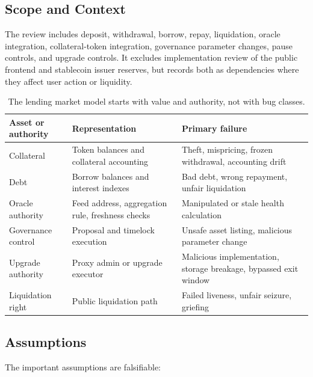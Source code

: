 \subsection{Scope and Context}

The review includes deposit, withdrawal, borrow, repay, liquidation, oracle integration, collateral-token integration, governance parameter changes, pause controls, and upgrade controls. It excludes implementation review of the public frontend and stablecoin issuer reserves, but records both as dependencies where they affect user action or liquidity.

\begin{table}[htbp]
\centering
\small
\renewcommand{\arraystretch}{1.18}
\begin{tabularx}{\textwidth}{@{}>{\RaggedRight\arraybackslash}p{}>{\RaggedRight\arraybackslash}p{}X@{}}
\toprule
Asset or authority & Representation & Primary failure \\
\midrule
Collateral & Token balances and collateral accounting & Theft, mispricing, frozen withdrawal, accounting drift \\
Debt & Borrow balances and interest indexes & Bad debt, wrong repayment, unfair liquidation \\
Oracle authority & Feed address, aggregation rule, freshness checks & Manipulated or stale health calculation \\
Governance control & Proposal and timelock execution & Unsafe asset listing, malicious parameter change \\
Upgrade authority & Proxy admin or upgrade executor & Malicious implementation, storage breakage, bypassed exit window \\
Liquidation right & Public liquidation path & Failed liveness, unfair seizure, griefing \\
\bottomrule
\end{tabularx}
\caption{The lending market model starts with value and authority, not with bug classes.}
\end{table}

\subsection{Assumptions}

The important assumptions are falsifiable:

